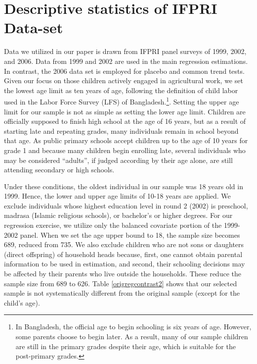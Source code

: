 \documentclass[12pt,letterpaper]{article}
\newcommand{\0}{\ensuremath{\mbox{\boldmath $0$}}}
\begin{document}

\pagebreak

\section{Descriptive statistics of IFPRI Data-set\label{app_a3}}

Data we utilized in our paper is drawn from IFPRI panel surveys of 1999, 2002, and 2006. Data from 1999 and 2002 are used in the main regression estimations. In contrast, the 2006 data set is employed for placebo and common trend tests. Given our focus on those children actively engaged in agricultural work, we set the lowest age limit as ten years of age, following the definition of child labor used in the Labor Force Survey (LFS) of Bangladesh.\footnote{In Bangladesh, the official age to begin schooling is six years of age. However, some parents choose to begin later. As a result, many of our sample children are still in the primary grades despite their age, which is suitable for the post-primary grades.}. Setting the upper age limit for our sample is not as simple as setting the lower age limit. Children are officially supposed to finish high school at the age of 16 years, but as a result of starting late and repeating grades, many individuals remain in school beyond that age. As public primary schools accept children up to the age of 10 years for grade 1 and because many children begin enrolling late, several individuals who may be considered  ``adults'',  if judged according by their age alone, are still attending secondary or high schools.

Under these conditions, the oldest individual in our sample was 18 years old in 1999. Hence, the lower and upper age limits of 10-18 years are applied. We exclude individuals whose highest education level in round 2 (2002) is preschool, madrasa (Islamic religious schools), or bachelor's or higher degrees. For our regression exercise, we utilize only the balanced covariate portion of the 1999-2002 panel. When we set the age upper bound to 18, the sample size becomes 689, reduced from 735. We also exclude children who are not sons or daughters (direct offspring) of household heads because, first, one cannot obtain parental information to be used in estimation, and second, their schooling decisions may be affected by their parents who live outside the households. These reduce the sample size from 689 to 626. Table \ref{origregcontrast2} shows that our selected sample is not systematically different from the original sample (except for the child's age). 
\end{document}
